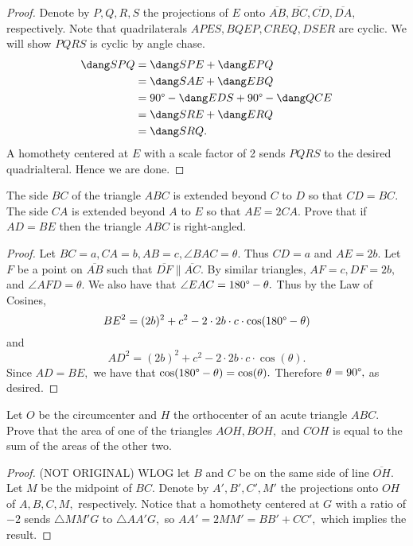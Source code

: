 \documentclass[letterpaper,oneside]{scrartcl}
\providecommand{\ol}{\overline}
\begin{document}
\begin{proof}
  Denote by $P,Q,R,S$ the projections of $E$ onto $\ol{AB},\ol{BC},\ol{CD},\ol{DA},$ respectively. Note that quadrilaterals $APES, BQEP, CREQ, DSER$ are cyclic. We will show $PQRS$ is cyclic by angle chase.
  \begin{align*}
    \dang SPQ & = \dang SPE + \dang EPQ                         \\
              & = \dang SAE + \dang EBQ                         \\
              & = 90\degree - \dang EDS + 90\degree - \dang QCE \\
              & = \dang SRE + \dang ERQ                         \\
              & = \dang SRQ.
  \end{align*}
  A homothety centered at $E$ with a scale factor of 2 sends $PQRS$ to the desired quadrialteral. Hence we are done.
\end{proof}

\begin{problem*}
  [3.26, EGMO 2013/1]
  The side $BC$ of the triangle $ABC$ is extended beyond $C$ to $D$ so that $CD=BC$. The side $CA$ is extended beyond $A$ to $E$ so that $AE=2CA$. Prove that if $AD=BE$ then the triangle $ABC$ is right-angled.
\end{problem*}

\begin{proof}
  Let $BC=a, CA=b, AB=c,\angle BAC = \theta.$ Thus $CD = a$ and $AE = 2b.$ Let $F$ be a point on $\ol{AB}$ such that $\ol{DF} \parallel \ol{AC}.$ By similar triangles, $AF=c, DF = 2b,$ and $\angle AFD = \theta.$ We also have that $\angle EAC = 180\degree - \theta.$ Thus by the Law of Cosines,
  $${BE}^2 = (2b)^2+c^2-2\cdot 2b \cdot c\cdot\cos(180\degree - \theta)$$ and $${AD}^2 = (2b)^2+c^2-2\cdot 2b \cdot c\cdot\cos(\theta).$$
  Since $AD = BE,$ we have that $\cos(180\degree - \theta) = \cos(\theta).$ Therefore $\theta = 90\degree,$ as desired.
\end{proof}

\begin{problem*}
  [3.27, APMO 2004/2]
  Let $O$ be the circumcenter and $H$ the orthocenter of an acute triangle $ABC$. Prove that the area of one of the triangles $AOH, BOH,$ and $COH$ is equal to the sum of the areas of the other two.
\end{problem*}
\begin{proof}
  (NOT ORIGINAL) WLOG let $B$ and $C$ be on the same side of line $\ol{OH}.$ Let $M$ be the midpoint of $BC.$ Denote by $A',B',C',M'$ the projections onto $OH$ of $A,B,C,M,$ respectively. Notice that a homothety centered at $G$ with a ratio of $-2$ sends $\triangle MM'G$ to $\triangle AA'G,$ so $AA' = 2MM' = BB' + CC',$ which implies the result.
\end{proof}
\end{document}
